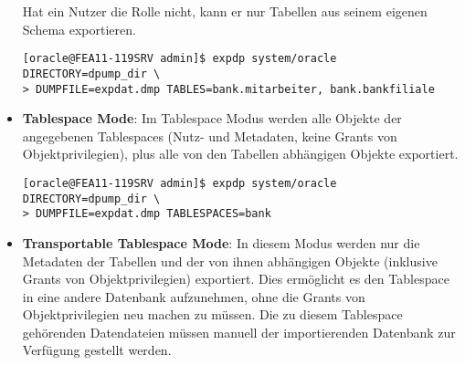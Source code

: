 \begin{itemize}
          Hat ein Nutzer die Rolle  nicht, kann er nur Tabellen aus seinem eigenen Schema exportieren.
          \begin{lstlisting}[caption={Table Export},label=admin903,language=expdp_impdp,emph={[9]DIRECTORY, TABLES},emphstyle={[9]\sffamily\color{blue}}]
[oracle@FEA11-119SRV admin]$ expdp system/oracle DIRECTORY=dpump_dir \
> DUMPFILE=expdat.dmp TABLES=bank.mitarbeiter, bank.bankfiliale
          \end{lstlisting}
          \item \textbf{Tablespace Mode}: Im Tablespace Modus werden alle Objekte der angegebenen Tablespaces (Nutz- und Metadaten, keine Grants von Objektprivilegien), plus alle von den Tabellen abh\"angigen Objekte exportiert.
          \begin{lstlisting}[caption={Tablespace Export},label=admin904,language=expdp_impdp,emph={[9]DIRECTORY},emphstyle={[9]\sffamily\color{blue}}]
[oracle@FEA11-119SRV admin]$ expdp system/oracle DIRECTORY=dpump_dir \
> DUMPFILE=expdat.dmp TABLESPACES=bank
          \end{lstlisting}
          \item \textbf{Transportable Tablespace Mode}: In diesem Modus werden nur die Metadaten der Tabellen und der von ihnen abh\"angigen Objekte (inklusive Grants von Objektprivilegien) exportiert. Dies erm\"oglicht es den Tablespace in eine andere Datenbank aufzunehmen, ohne die Grants von Objektprivilegien neu machen zu m\"ussen. Die zu diesem Tablespace geh\"orenden Datendateien m\"ussen manuell der importierenden Datenbank zur Verf\"ugung gestellt werden.


\end{itemize}
